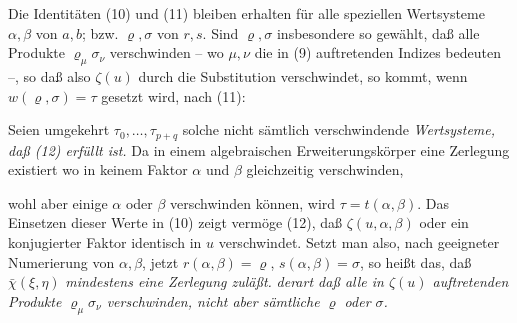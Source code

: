 Die Identitäten (10) und (11) bleiben erhalten für alle speziellen Wertsysteme $\alpha,\beta$ von $a,b$; bzw. $\varrho,\sigma$ von $r,s$. Sind $\varrho,\sigma$ insbesondere so gewählt, daß alle Produkte $\varrho_\mu\sigma_\nu$ verschwinden -- wo $\mu,\nu$ die in (9) auftretenden Indizes bedeuten --, so daß also $\zeta(u)$ durch die Substitution verschwindet, so kommt, wenn $w(\varrho,\sigma)=\tau$ gesetzt wird, nach (11):

Seien umgekehrt $\tau_0,\ldots,\tau_{p+q}$ solche nicht sämtlich verschwindende \emph{Wertsysteme, daß (12) erfüllt ist.} Da in einem algebraischen Erweiterungskörper eine Zerlegung existiert
wo in keinem Faktor $\alpha$ und $\beta$ gleichzeitig verschwinden,\addtocounter{footnote}{1} wohl aber einige $\alpha$ oder $\beta$ verschwinden können, wird $\tau=t(\alpha,\beta)$. Das Einsetzen dieser Werte in (10) zeigt vermöge (12), daß $\zeta(u,\alpha,\beta)$ oder ein konjugierter Faktor identisch in $u$ verschwindet. Setzt man also, nach geeigneter Numerierung von $\alpha,\beta$, jetzt $r(\alpha,\beta)=\varrho$, $s(\alpha,\beta)=\sigma$, so heißt das, daß $\bar\chi(\xi,\eta)$ \emph{mindestens eine Zerlegung zuläßt.}
\emph{derart daß alle in $\zeta(u)$ auftretenden Produkte $\varrho_\mu\sigma_\nu$ verschwinden, nicht aber sämtliche $\varrho$ oder $\sigma$.}

